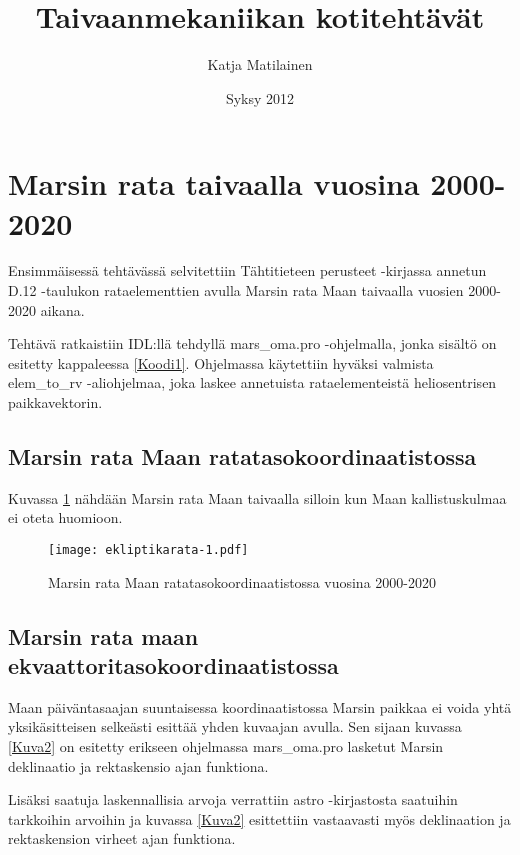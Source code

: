 \documentclass[12pt, a4paper]{article}
\author{Katja Matilainen}
\title{Taivaanmekaniikan kotitehtävät}
\date{Syksy 2012}
\begin{document}
\begin{titlepage}
\maketitle
\end{titlepage}

\section[Tehtävä 1]{Marsin rata taivaalla vuosina 2000-2020}

Ensimmäisessä tehtävässä selvitettiin Tähtitieteen perusteet -kirjassa annetun D.12 -taulukon rataelementtien avulla Marsin rata Maan taivaalla vuosien 2000-2020 aikana.

Tehtävä ratkaistiin IDL:llä tehdyllä mars\_oma.pro -ohjelmalla, jonka sisältö on esitetty kappaleessa \ref{Koodi1}. Ohjelmassa käytettiin hyväksi valmista elem\_to\_rv -aliohjelmaa, joka laskee annetuista rataelementeistä heliosentrisen paikkavektorin.


\subsection[Ekliptikarata]{Marsin rata Maan ratatasokoordinaatistossa}\label{Ekliptika}

Kuvassa \ref{Kuva1} nähdään Marsin rata Maan taivaalla silloin kun Maan kallistuskulmaa ei oteta huomioon.

\begin{figure}[ht]
\texttt{[image: ekliptikarata-1.pdf]}
\caption{Marsin rata Maan ratatasokoordinaatistossa vuosina 2000-2020}
\label{Kuva1}
\end{figure}

\newpage
\subsection[Ekvaattorirata]{Marsin rata maan ekvaattoritasokoordinaatistossa}\label{Ekvaattori}

Maan päiväntasaajan suuntaisessa koordinaatistossa Marsin paikkaa ei voida yhtä yksikäsitteisen selkeästi esittää yhden kuvaajan avulla. Sen sijaan kuvassa \ref{Kuva2} on esitetty erikseen ohjelmassa mars\_oma.pro lasketut Marsin deklinaatio ja rektaskensio ajan funktiona.

Lisäksi saatuja laskennallisia arvoja verrattiin astro -kirjastosta saatuihin tarkkoihin arvoihin ja kuvassa \ref{Kuva2} esittettiin vastaavasti myös deklinaation ja rektaskension virheet ajan funktiona.
\end{document}
